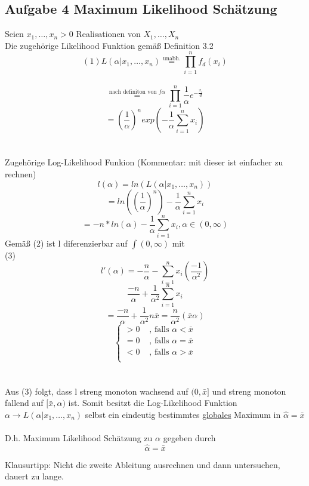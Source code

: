 \documentclass[10pt,a4paper]{article}
\begin{document}
\subsection{Aufgabe 4 Maximum Likelihood Schätzung}
Seien $x_1,\dots,x_n > 0 $ Realisationen von $X_1,\dots,X_n$\\
Die zugehörige Likelihood Funktion gemäß Definition 3.2\\
$$(1) L(\alpha|x_1,\dots,x_n) \overset{\text{unabh.}}{=} \prod_{i=1}^{n}f_d(x_i)$$ \\ 
$$\overset{\text{nach definiton von }f \alpha}{=}  \prod_{i=1}^{n} \frac{1}{\alpha} e^{-\frac{x_i}{d}}$$
$$= (\frac{1}{\alpha})^n exp(- \frac{1}{\alpha} \sum_{i=1}^{n} x_i)$$ \\~\\
Zugehörige Log-Likelihood Funkion (Kommentar: mit dieser ist einfacher zu rechnen)\\
$$l(\alpha) = ln (L(\alpha|x_1,\dots,x_n))$$ 
$$= ln((\frac{1}{\alpha})^n) - \frac{1}{\alpha} \sum_{i=1}^{n} x_i $$
$$=-n*ln(\alpha) - \frac{1}{\alpha}\sum_{i=1}^{n}x_i,\alpha \in (0,\infty) $$ 
Gemäß (2) ist l diferenzierbar auf $\int(0,\infty)$ mit\\ (3) $$l'(\alpha) = - \frac{n}{\alpha} - \sum_{i=1}^{n} x_i (\frac{-1}{\alpha^2})$$
$$\frac{-n}{\alpha} + \frac{1}{\alpha^2}\sum_{i=1}^{n}x_i $$
$$= \frac{-n}{\alpha} + \frac{1}{\alpha^2} n \bar{x} = \frac{n}{\alpha^2}(\bar{x}\alpha) $$
$$\begin{cases}
>0 & \text{ , falls } \alpha < \bar{x}\\
= 0 & \text{ , falls } \alpha = \bar{x}\\
<0 & \text{ , falls } \alpha > \bar{x}\\
\end{cases}$$
\\~\\
Aus (3) folgt, dass l streng monoton wachsend auf $(0,\bar{x}]$ und streng monoton fallend auf $[\bar{x},\alpha)$ ist. Somit besitzt die Log-Likelihood Funktion $\alpha \rightarrow L(\alpha| x_1,\dots , x_n)$ selbst ein eindeutig bestimmtes \underline{globales} Maximum in $\hat{\alpha} = \bar{x}$\\~\\
D.h. Maximum Likelihood Schätzung zu $\alpha$ gegeben durch $$\hat{\alpha} = \bar{x}$$


Klausurtipp:  Nicht die zweite Ableitung ausrechnen und dann untersuchen, dauert zu lange.
\end{document}
